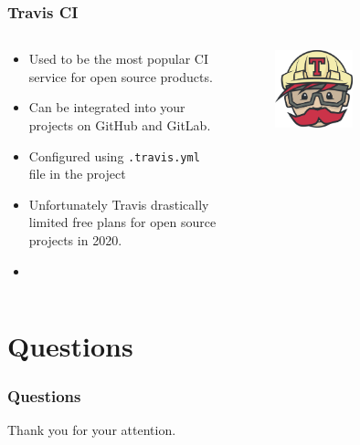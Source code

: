 \documentclass[aspectratio=169]{beamer}
\begin{document}
\begin{frame}
	\frametitle{Travis CI}
	
	\begin{columns}
\begin{column}{0.6\textwidth}
	\begin{block}{}
		\begin{itemize}
			\item Used to be the most popular CI service for open source products.
			\item Can be integrated into your projects on GitHub and GitLab.
			\item Configured using \texttt{.travis.yml} file in the project
			\item Unfortunately Travis drastically limited free plans for open source projects in 2020\footnotemark.
			\item {}
		\end{itemize}
	\end{block}
\end{column}
\begin{column}{0.4\textwidth}
	\begin{figure}[ht!]
	\begin{center}
  	  \includegraphics[width=0.5\textwidth]{img/travis-logo.png}
	\end{center}
	\end{figure}
\end{column}
\end{columns}

\end{frame}


\section{Questions}

\begin{frame}
	\frametitle{Questions}

	\begin{center}
	Thank you for your attention.
	\end{center}

\vspace{0.5cm}

	\begin{center}
	\end{center}
\end{frame}
\end{document}
